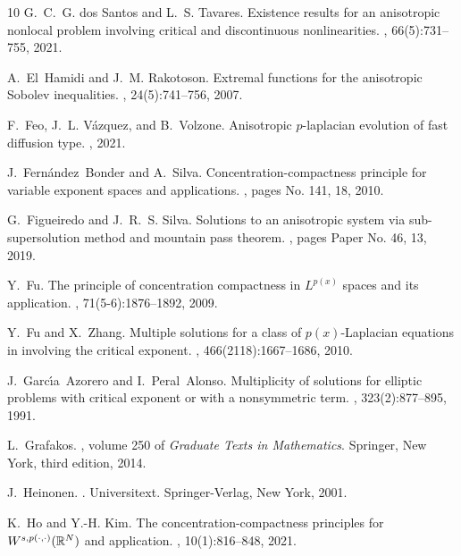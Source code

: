 \documentclass[11pt]{amsart}
\theoremstyle{plain}
\theoremstyle{definition}
\numberwithin{equation}{section}
\begin{document}
\begin{thebibliography}{10}
G.~C.~G. dos Santos and L.~S. Tavares.
\newblock Existence results for an anisotropic nonlocal problem involving
  critical and discontinuous nonlinearities.
, 66(5):731--755, 2021.

A.~El~Hamidi and J.~M. Rakotoson.
\newblock Extremal functions for the anisotropic {S}obolev inequalities.
,
  24(5):741--756, 2007.

F.~Feo, J.~L. V\'{a}zquez, and B.~Volzone.
\newblock Anisotropic $p$-laplacian evolution of fast diffusion type.
, 2021.

J.~Fern\'{a}ndez~Bonder and A.~Silva.
\newblock Concentration-compactness principle for variable exponent spaces and
  applications.
, pages No. 141, 18, 2010.

G.~Figueiredo and J.~R.~S. Silva.
\newblock Solutions to an anisotropic system via sub-supersolution method and
  mountain pass theorem.
, pages Paper No. 46, 13,
  2019.

Y.~Fu.
\newblock The principle of concentration compactness in {$L^{p(x)}$} spaces and
  its application.
, 71(5-6):1876--1892, 2009.

Y.~Fu and X.~Zhang.
\newblock Multiple solutions for a class of {$p(x)$}-{L}aplacian equations in
  involving the critical exponent.
,
  466(2118):1667--1686, 2010.

J.~Garc\'{\i}a~Azorero and I.~Peral~Alonso.
\newblock Multiplicity of solutions for elliptic problems with critical
  exponent or with a nonsymmetric term.
, 323(2):877--895, 1991.

L.~Grafakos.
, volume 250 of {\em Graduate Texts in
  Mathematics}.
\newblock Springer, New York, third edition, 2014.

J.~Heinonen.
.
\newblock Universitext. Springer-Verlag, New York, 2001.

K.~Ho and Y.-H. Kim.
\newblock The concentration-compactness principles for
  {$W^{s,p(\cdot,\cdot)}(\Bbb R^N)$} and application.
, 10(1):816--848, 2021.


\end{thebibliography}
\end{document}
